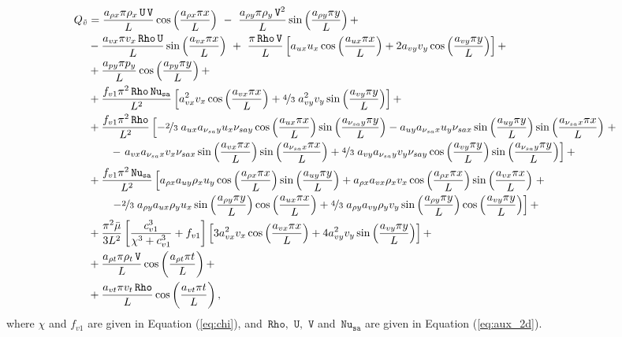 \documentclass[10pt]{article}
\newcommand{\Rho}{\,\mathtt{Rho}}
\newcommand{\U}{\,\mathtt{U}}
\newcommand{\V}{\,\mathtt{V}}
\newcommand{\Nu}{\,\mathtt{Nu_{sa}}}
\newcommand{\tv}{\tilde{v}}
\newcommand{\bmu}{\bar{\mu}}
\begin{document}
\begin{equation}
 \begin{split}
Q_{\tv} &= \dfrac{a_{\rho x} \pi \rho_x \U \V  }{L}\cos\left(\dfrac{a_{\rho x} \pi x}{L}\right) \,\,-\,\,\dfrac{a_{\rho y} \pi \rho_y \V^2 }{L} \sin\left(\dfrac{a_{\rho y} \pi y}{L}\right)+ \\
&-\dfrac{a_{vx} \pi v_x \Rho \U  }{L}\sin\left(\dfrac{a_{vx} \pi x}{L}\right) \,\,+\,\,\dfrac{ \pi \Rho \V}{L}\left[a_{ux} u_x  \cos\left(\dfrac{a_{ux} \pi x}{L}\right)+2 a_{vy} v_y  \cos\left(\dfrac{a_{vy} \pi y}{L}\right)\right]+ \\
&+\dfrac{a_{py} \pi p_y  }{L}\cos\left(\dfrac{a_{py} \pi y}{L}\right)+ \\
&+\dfrac{f_{v1} \pi^2 \Rho \Nu}{L^2}\left[a_{vx}^2 v_x  \cos\left(\dfrac{a_{vx} \pi x}{L}\right)+\nicefrac{4}{3} \; a_{vy}^2 v_y  \sin\left(\dfrac{a_{vy} \pi y}{L}\right)\right] + \\
&+\dfrac{f_{v1} \pi^2 \Rho}{L^2}\left[-\nicefrac{2}{3} \; a_{ux} a_{\nu_{sa} y} u_x \nu_{sa y}  \cos\left(\dfrac{a_{ux} \pi x}{L}\right)  \sin\left(\dfrac{a_{\nu_{sa} y} \pi y}{L}\right)- a_{uy} a_{\nu_{sa} x} u_y \nu_{sa x} \sin\left(\dfrac{a_{uy} \pi y}{L}\right)  \sin\left(\dfrac{a_{\nu_{sa} x} \pi x}{L}\right)\right.+\\
    &\qquad -\left. a_{vx} a_{\nu_{sa} x} v_x \nu_{sa x} \sin\left(\dfrac{a_{vx} \pi x}{L}\right)  \sin\left(\dfrac{a_{\nu_{sa} x} \pi x}{L}\right)+\nicefrac{4}{3} \;  a_{vy} a_{\nu_{sa} y} v_y \nu_{sa y} \cos\left(\dfrac{a_{vy} \pi y}{L}\right)  \sin\left(\dfrac{a_{\nu_{sa} y} \pi y}{L}\right)\right] + \\
&+\dfrac{f_{v1} \pi^2 \Nu }{L^2}\left[a_{\rho x} a_{uy} \rho_x u_y  \cos\left(\dfrac{a_{\rho x} \pi x}{L}\right)  \sin\left(\dfrac{a_{uy} \pi y}{L}\right)+a_{\rho x} a_{vx} \rho_x v_x  \cos\left(\dfrac{a_{\rho x} \pi x}{L}\right)  \sin\left(\dfrac{a_{vx} \pi x}{L}\right)\right.+\\
    &\qquad\left. -\nicefrac{2}{3} \; a_{\rho y} a_{ux} \rho_y u_x  \sin\left(\dfrac{a_{\rho y} \pi y}{L}\right)  \cos\left(\dfrac{a_{ux} \pi x}{L}\right)+\nicefrac{4}{3} \; a_{\rho y} a_{vy} \rho_y v_y  \sin\left(\dfrac{a_{\rho y} \pi y}{L}\right)  \cos\left(\dfrac{a_{vy} \pi y}{L}\right)\right] + \\
&+ \dfrac{\pi^2 \bmu}{3L^2}\left[\dfrac{c_{v1}^3 }{ \chi^3+c_{v1}^3} +f_{v1}\right]\left[3 a_{vx}^2 v_x  \cos\left(\dfrac{a_{vx} \pi x}{L}\right)+4 a_{vy}^2 v_y  \sin\left(\dfrac{a_{vy} \pi y}{L}\right)\right] +\\
&+\dfrac{a_{\rho t} \pi \rho_t \V}{L}  \cos\left(\dfrac{a_{\rho t} \pi t}{L}\right)+ \\
&+\dfrac{a_{vt} \pi v_t \Rho }{L} \cos\left(\dfrac{a_{vt} \pi t}{L}\right),
 \end{split}
\end{equation}
where $\chi$ and $f_{v1}$ are given in  Equation (\ref{eq:chi}), and  $\Rho,\,\U,\,\V$ and $\Nu$ are given in Equation (\ref{eq:aux_2d}).
\end{document}
